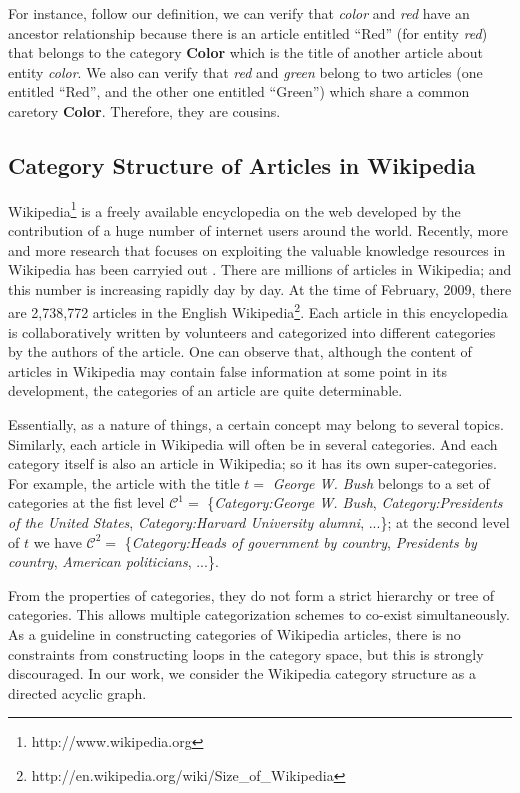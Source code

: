 For instance, follow our definition, we can verify that {\em color} and {\em red} have an ancestor relationship because there is an article entitled ``Red'' (for entity {\em red}) that belongs to the category {\bf Color} which is the title of another article about entity {\em color}.
We also can verify that {\em red} and {\em green} belong to two articles (one entitled ``Red'', and the other one entitled ``Green'') which share a common caretory {\bf Color}. Therefore, they are cousins.


\subsection{Category Structure of Articles in Wikipedia}
\label{sec:wikipedia-category-structure}
Wikipedia\footnote{http://www.wikipedia.org} is a freely available encyclopedia on the web developed by the contribution of a huge number of internet users around the world. Recently, more and more research that focuses on exploiting the valuable knowledge resources in Wikipedia has been carryied out \cite{CRRS08,richman-schone:2008:ACLMain,suchanek2007WWW,citeulike:2157093}.
There are millions of articles in Wikipedia; and this number is increasing rapidly day by day.
At the time of February, 2009, there are 2,738,772 articles in the English Wikipedia\footnote{http://en.wikipedia.org/wiki/Size\_of\_Wikipedia}.
Each article in this encyclopedia is collaboratively written by volunteers and categorized into different categories by the authors of the article.
One can observe that, although the content of articles in Wikipedia may contain false information at some point in its development, the categories of an article are quite determinable. 

Essentially, as a nature of things, a certain concept may belong to several topics. Similarly, each article in Wikipedia will often be in several categories. And each category itself is also an article in Wikipedia; so it has its own super-categories. For example, the article with the title $t = $ {\em George W. Bush} belongs to a set of categories at the fist level $\mathcal{C}^{1} = $ \{{\em Category:George W. Bush}, {\em Category:Presidents of the United States}, {\em Category:Harvard University alumni}, ...\}; at the second level of $t$ we have
$\mathcal{C}^{2} = $ \{{\em Category:Heads of government by country}, {\em Presidents by country}, {\em American politicians}, ...\}.

From the properties of categories, they do not form a strict hierarchy or tree of categories. This allows multiple categorization schemes to co-exist simultaneously. As a guideline in constructing categories of Wikipedia articles, there is no constraints from constructing loops in the category space, but this is strongly discouraged. In our work, we consider the Wikipedia category structure as a directed acyclic graph.

